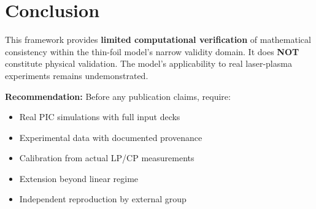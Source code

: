 \documentclass[11pt]{article}
\begin{document}
\section{Conclusion}

This framework provides \textbf{limited computational verification} of mathematical consistency within the thin-foil model's narrow validity domain. It does \textbf{NOT} constitute physical validation. The model's applicability to real laser-plasma experiments remains undemonstrated.

\textbf{Recommendation:} Before any publication claims, require:
\begin{itemize}
    \item Real PIC simulations with full input decks
    \item Experimental data with documented provenance
    \item Calibration from actual LP/CP measurements
    \item Extension beyond linear regime
    \item Independent reproduction by external group
\end{itemize}
\end{document}
